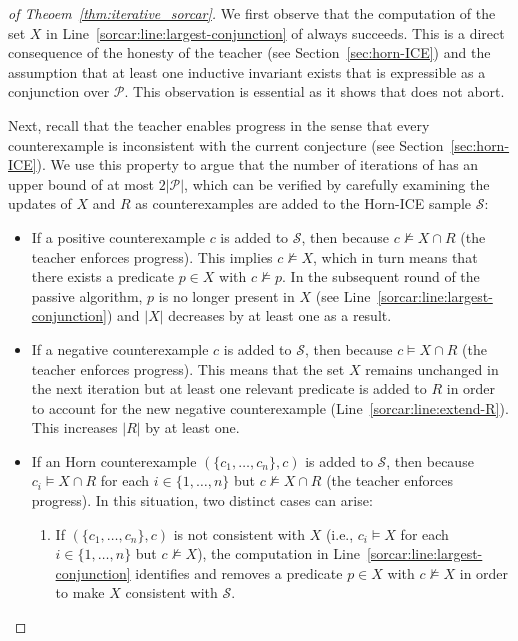 \begin{proof}[of Theoem~\ref{thm:iterative_sorcar}]
We first observe that the computation of the set $X$ in Line~\ref{sorcar:line:largest-conjunction} of \SorcarPassive always succeeds.
This is a direct consequence of the honesty of the teacher (see Section~\ref{sec:horn-ICE}) and the assumption that at least one inductive invariant exists that is expressible as a conjunction over $\mathcal P$.
This observation is essential as it shows that \SorcarIterative does not abort.

Next, recall that the teacher enables progress in the sense that every counterexample is inconsistent with the current conjecture (see Section~\ref{sec:horn-ICE}).
We use this property to argue that the number of iterations of \SorcarIterative has an upper bound of at most $2|\mathcal P|$, which can be verified by carefully examining the updates of $X$ and $R$ as counterexamples are added to the Horn-ICE sample $\mathcal S$:
\begin{itemize}
	\item If a positive counterexample $c$ is added to $\mathcal S$, then because $c \not\models X \cap R$ (the teacher enforces progress).
	This implies $c \not\models X$, which in turn means that there exists a predicate $p \in X$ with $c \not\models p$.
	In the subsequent round of the passive \sorcar algorithm, $p$ is no longer present in $X$ (see Line~\ref{sorcar:line:largest-conjunction}) and $|X|$ decreases by at least one as a result.
	\item If a negative counterexample $c$ is added to $\mathcal S$, then because $c \models X \cap R$ (the teacher enforces progress).
	This means that the set $X$ remains unchanged in the next iteration but at least one relevant predicate is added to $R$ in order to account for the new negative counterexample (Line~\ref{sorcar:line:extend-R}). This increases $|R|$ by at least one.
	\item If an Horn counterexample $(\{ c_1, \ldots, c_n \}, c)$ is added to $\mathcal S$, then because $c_i \models X \cap R$ for each $i \in \{ 1, \ldots, n \}$ but $c \not\models X \cap R$ (the teacher enforces progress).
	In this situation, two distinct cases can arise:
	\begin{enumerate}
	    \item If $(\{ c_1, \ldots, c_n \}, c)$ is not consistent with $X$ (i.e., $c_i \models X$ for each $i \in \{ 1, \ldots, n \}$ but $c \not\models X$), the computation in Line~\ref{sorcar:line:largest-conjunction} identifies and removes a predicate $p \in X$ with $c \not\models X$ in order to make $X$ consistent with $\mathcal S$.

\end{enumerate}
\end{itemize}
\end{proof}
